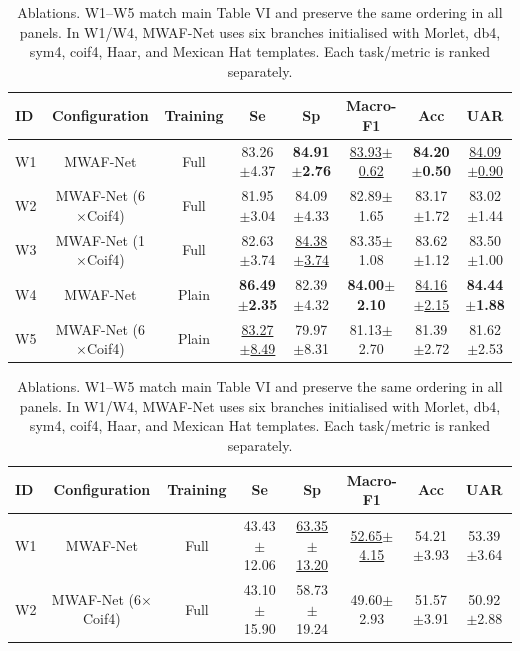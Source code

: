 \begin{table}[H]
\centering\color{black}
\caption{Ablations. W1--W5 match main Table VI and preserve the same ordering in all panels. In W1/W4, MWAF-Net uses six branches initialised with Morlet, db4, sym4, coif4, Haar, and Mexican Hat templates. Each task/metric is ranked separately.}\label{tab:supp_controlled}
\label{tab:supp_controlled_binary}
\label{tab:supp_controlled_multiclass}
\begingroup
\fontsize{8.5}{10.0}\selectfont
\setlength{\tabcolsep}{2.4pt}\renewcommand{\arraystretch}{1.04}
\begin{tabular*}{\linewidth}{@{\extracolsep{\fill}}lccccccc@{}}\toprule
\textbf{ID} & \textbf{Configuration} & \textbf{Training} & \textbf{Se} & \textbf{Sp} & \textbf{Macro-F1} & \textbf{Acc} & \textbf{UAR}\\\midrule
W1 & MWAF-Net & Full & 83.26$\pm$4.37 & \textbf{84.91$\pm$2.76} & \underline{83.93$\pm$0.62} & \textbf{84.20$\pm$0.50} & \underline{84.09$\pm$0.90}\\
W2 & MWAF-Net (6$\times$Coif4) & Full & 81.95$\pm$3.04 & 84.09$\pm$4.33 & 82.89$\pm$1.65 & 83.17$\pm$1.72 & 83.02$\pm$1.44\\
W3 & MWAF-Net (1$\times$Coif4) & Full & 82.63$\pm$3.74 & \underline{84.38$\pm$3.74} & 83.35$\pm$1.08 & 83.62$\pm$1.12 & 83.50$\pm$1.00\\
W4 & MWAF-Net & Plain & \textbf{86.49$\pm$2.35} & 82.39$\pm$4.32 & \textbf{84.00$\pm$2.10} & \underline{84.16$\pm$2.15} & \textbf{84.44$\pm$1.88}\\
W5 & MWAF-Net (6$\times$Coif4) & Plain & \underline{83.27$\pm$8.49} & 79.97$\pm$8.31 & 81.13$\pm$2.70 & 81.39$\pm$2.72 & 81.62$\pm$2.53\\
\bottomrule\end{tabular*}
\endgroup
{}
\begingroup
\fontsize{8.5}{10.0}\selectfont
\setlength{\tabcolsep}{2.4pt}\renewcommand{\arraystretch}{1.04}
\begin{tabular*}{\linewidth}{@{\extracolsep{\fill}}lccccccc@{}}\toprule
\textbf{ID} & \textbf{Configuration} & \textbf{Training} & \textbf{Se} & \textbf{Sp} & \textbf{Macro-F1} & \textbf{Acc} & \textbf{UAR}\\\midrule
W1 & MWAF-Net & Full & 43.43$\pm$12.06 & \underline{63.35$\pm$13.20} & \underline{52.65$\pm$4.15} & 54.21$\pm$3.93 & 53.39$\pm$3.64\\
W2 & MWAF-Net (6$\times$Coif4) & Full & 43.10$\pm$15.90 & 58.73$\pm$19.24 & 49.60$\pm$2.93 & 51.57$\pm$3.91 & 50.92$\pm$2.88\\

\end{tabular*}
\end{table}
